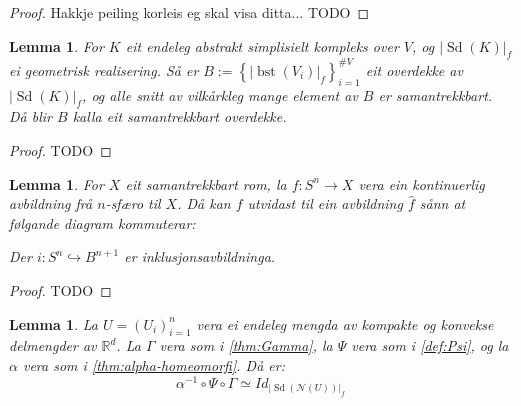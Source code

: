 \documentclass[a4paper, 12pt, norsk]{article}
\theoremstyle{plain}
\newtheorem{lemma}[theorem]{Lemma}
\theoremstyle{definition}
\newcommand{\Rb}{\mathbb{R}}
\newcommand{\Nc}{\mathcal{N}}
\newcommand{\gr}[1]{ \lvert #1 \rvert } %
\newcommand{\set}[1]{ \left \{ #1 \right \} } %
\newcommand{\tuple}[1]{ \left( #1 \right) } %
\DeclareMathOperator{\Sd}{Sd}
\DeclareMathOperator{\bst}{bst}
\begin{document}
\begin{proof}
	Hakkje peiling korleis eg skal visa ditta... TODO
\end{proof}

\begin{lemma} \label{thm:bst-good}
	For \( K \) eit endeleg abstrakt simplisielt kompleks over \( V \), og \( \gr{\Sd(K)}_f \) ei geometrisk realisering. Så er \( B := \set{\gr{\bst(V_i)}_f}_{i=1}^{\# V} \) eit overdekke av \( \gr{\Sd(K)}_f \), og alle snitt av vilkårkleg mange element av \( B \) er samantrekkbart. Då blir \( B \) kalla eit samantrekkbart overdekke.
\end{lemma}

\begin{proof}
	TODO
\end{proof}

\begin{lemma} \label{thm:utvida-avb}
	For \( X \) eit samantrekkbart rom, la \( f: S^n \to X \) vera ein kontinuerlig avbildning frå \( n \)-sfæro til \( X \). Då kan \( f \) utvidast til ein avbildning \( \hat{f} \) sånn at følgande diagram kommuterar:

	\begin{center} %
	\end{center}
	Der \( i: S^n \hookrightarrow B^{n+1} \) er inklusjonsavbildninga.
\end{lemma}

\begin{proof}
	TODO
\end{proof}

\begin{lemma} \label{thm:homeq-sd} %
	La \( U = \tuple{U_i}_{i=1}^n \) vera ei endeleg mengda av kompakte og konvekse delmengder av \( \Rb^d \). La \( \Gamma \) vera som i \autoref{thm:Gamma}, la \( \Psi \) vera som i \autoref{def:Psi}, og la \( \alpha \) vera som i \autoref{thm:alpha-homeomorfi}. Då er:
	\[
		\alpha^{-1} \circ \Psi \circ \Gamma \simeq Id_{\gr{\Sd(\Nc(U))}_f}
	\]
\end{lemma}
\end{document}
